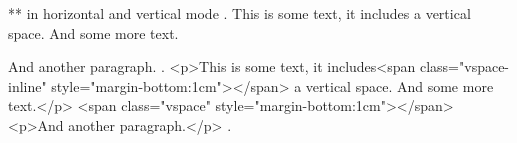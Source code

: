 ** \vspace{} in horizontal and vertical mode
.
This is some text, it includes\vspace{1cm} a vertical space. And some more text.

\vspace{1cm}
And another paragraph.
.
<p>This is some text, it includes<span class="vspace-inline" style="margin-bottom:1cm"></span> a vertical space. And some more text.</p>
<span class="vspace" style="margin-bottom:1cm"></span>
<p>And another paragraph.</p>
.
